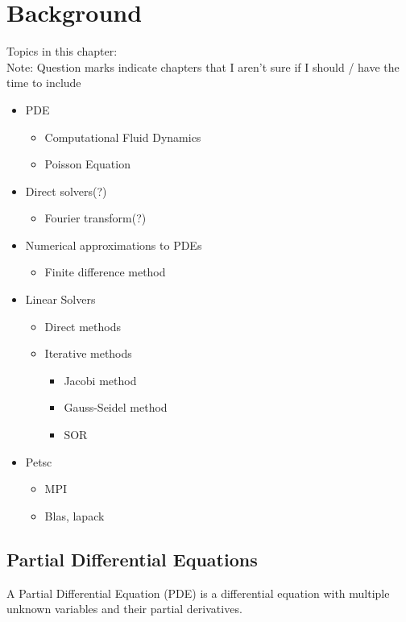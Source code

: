 \chapter{Background}

Topics in this chapter:\\
Note: Question marks indicate chapters that I aren't sure if I should / have the time to include
\begin{itemize}
	\item PDE
	\begin{itemize}
		\item Computational Fluid Dynamics
		\item Poisson Equation
	\end{itemize}
	\item Direct solvers(?)
	\begin{itemize}
		\item Fourier transform(?)
	\end{itemize}
	\item Numerical approximations to PDEs
	\begin{itemize}	
		\item Finite difference method
	\end{itemize}
	\item Linear Solvers
	\begin{itemize}
		\item Direct methods
		\item Iterative methods
		\begin{itemize}
			\item Jacobi method
			\item Gauss-Seidel method
			\item SOR
		\end{itemize}
	\end{itemize}
	\item Petsc
	\begin{itemize}
		\item MPI
		\item Blas, lapack
	\end{itemize}
\end{itemize}

\section*{Partial Differential Equations}

A Partial Differential Equation (PDE) is a differential equation with multiple 
unknown variables and their partial derivatives. 

